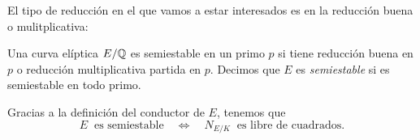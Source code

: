 El tipo de reducción en el que vamos a estar interesados es en la reducción buena o mulitplicativa:

\begin{defin}\label{defin:conductor}
  Una curva el\'iptica $E/\mathbb{Q}$ es semiestable en un primo $p$ si tiene reducci\'on buena en $p$
  o reducci\'on multiplicativa partida en $p$. Decimos que $E$ es \emph{semiestable} si es
  semiestable en todo primo.
\end{defin}

\begin{nota}
	Gracias a la definición del conductor de $E$, tenemos que
	\[
		E\;\;\text{es semiestable}\quad\iff\quad N_{E/K}\;\;\text{es libre de cuadrados}.
	\]	
\end{nota}
